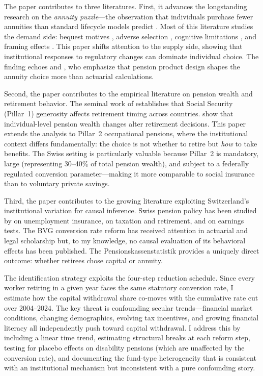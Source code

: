 \documentclass[12pt]{article}
\begin{document}
The paper contributes to three literatures. First, it advances the longstanding research on the \textit{annuity puzzle}---the observation that individuals purchase fewer annuities than standard lifecycle models predict \citep{yaari1965uncertain, davidoff2005annuities, brown2007rational}. Most of this literature studies the demand side: bequest motives \citep{lockwood2012bequest}, adverse selection \citep{finkelstein2004adverse}, cognitive limitations \citep{brown2008individual}, and framing effects \citep{beshears2014annuitization}. This paper shifts attention to the supply side, showing that institutional responses to regulatory changes can dominate individual choice. The finding echoes \citet{butlerteppa2007} and \citet{beshears2014annuitization}, who emphasize that pension product design shapes the annuity choice more than actuarial calculations.

Second, the paper contributes to the empirical literature on pension wealth and retirement behavior. The seminal work of \citet{grubewise1998, grubewise2004} establishes that Social Security (Pillar~1) generosity affects retirement timing across countries. \citet{coilegruber2007} show that individual-level pension wealth changes alter retirement decisions. This paper extends the analysis to Pillar~2 occupational pensions, where the institutional context differs fundamentally: the choice is not whether to retire but \textit{how} to take benefits. The Swiss setting is particularly valuable because Pillar~2 is mandatory, large (representing 30--40\% of total pension wealth), and subject to a federally regulated conversion parameter---making it more comparable to social insurance than to voluntary private savings.

Third, the paper contributes to the growing literature exploiting Switzerland's institutional variation for causal inference. Swiss pension policy has been studied by \citet{lalive2006ui} on unemployment insurance, \citet{bingley2013taxation} on taxation and retirement, and \citet{manoli2016nonparametric} on earnings tests. The BVG conversion rate reform has received attention in actuarial and legal scholarship \citep{gisler2019bvg} but, to my knowledge, no causal evaluation of its behavioral effects has been published. The Pensionskassenstatistik provides a uniquely direct outcome: whether retirees chose capital or annuity.

The identification strategy exploits the four-step reduction schedule. Since every worker retiring in a given year faces the same statutory conversion rate, I estimate how the capital withdrawal share co-moves with the cumulative rate cut over 2004--2024. The key threat is confounding secular trends---financial market conditions, changing demographics, evolving tax incentives, and growing financial literacy all independently push toward capital withdrawal. I address this by including a linear time trend, estimating structural breaks at each reform step, testing for placebo effects on disability pensions (which are unaffected by the conversion rate), and documenting the fund-type heterogeneity that is consistent with an institutional mechanism but inconsistent with a pure confounding story.
\end{document}
